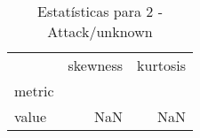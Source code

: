 \begin{table}[htbp]
\caption{Estatísticas para 2 - Attack/unknown}
\label{tab:2_-_attack_unknown_skewkurt}
\begin{tabular}{lrr}
\toprule
 & skewness & kurtosis \\
metric &  &  \\
\midrule
value & NaN & NaN \\
\bottomrule
\end{tabular}
\end{table}
